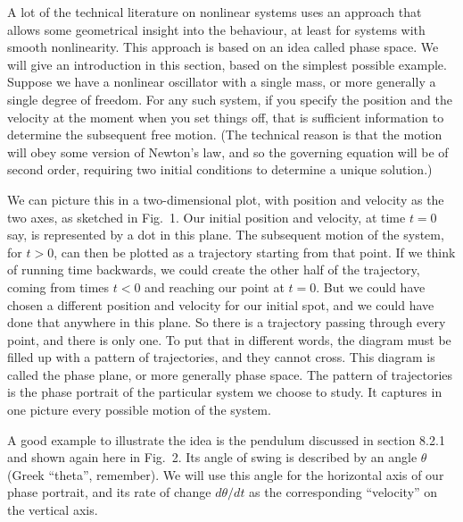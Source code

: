 

  A lot of the technical literature on nonlinear systems uses an approach that 
  allows some geometrical insight into the behaviour, at least for systems with 
  smooth nonlinearity. This approach is based on an idea called phase space. We 
  will give an introduction in this section, based on the simplest possible 
  example. Suppose we have a nonlinear oscillator with a single mass, or more 
  generally a single degree of freedom. For any such system, if you specify the 
  position and the velocity at the moment when you set things off, that is 
  sufficient information to determine the subsequent free motion. (The 
  technical reason is that the motion will obey some version of Newton’s law, 
  and so the governing equation will be of second order, requiring two initial 
  conditions to determine a unique solution.) 

  We can picture this in a two-dimensional plot, with position and velocity as 
  the two axes, as sketched in Fig.\ 1. Our initial position and velocity, at 
  time $t=0$ say, is represented by a dot in this plane. The subsequent motion 
  of the system, for $t>0$, can then be plotted as a trajectory starting from 
  that point. If we think of running time backwards, we could create the other 
  half of the trajectory, coming from times $t<0$ and reaching our point at 
  $t=0$. But we could have chosen a different position and velocity for our 
  initial spot, and we could have done that anywhere in this plane. So there is 
  a trajectory passing through every point, and there is only one. To put that 
  in different words, the diagram must be filled up with a pattern of 
  trajectories, and they cannot cross. This diagram is called the phase plane, 
  or more generally phase space. The pattern of trajectories is the phase 
  portrait of the particular system we choose to study. It captures in one 
  picture every possible motion of the system. 


  A good example to illustrate the idea is the pendulum discussed in section 
  8.2.1 and shown again here in Fig.\ 2. Its angle of swing is described by an 
  angle $\theta$ (Greek ``theta'', remember). We will use this angle for the 
  horizontal axis of our phase portrait, and its rate of change $d\theta / dt$ 
  as the corresponding ``velocity'' on the vertical axis. 


